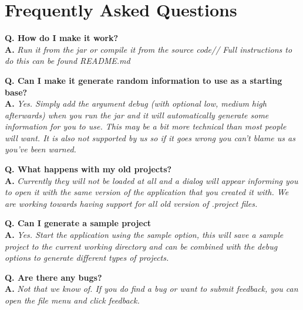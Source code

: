 \section{Frequently Asked Questions}

\newcommand{\faqentry}[2]{\textbf{Q. #1}\\  \textbf{A.} \textit{#2}\vspace{0.5cm}}


\faqentry{How do I make it work?}{Run it from the jar or compile it from the source code//
	Full instructions to  do this can be found README.md}

\faqentry{Can I make it generate random information to use as a starting base?}{Yes. Simply add the argument debug (with optional low, medium high afterwards) when you run the jar and it will automatically generate some information for you to use. This may be a bit more technical than most people will want. It is also not supported by us so if it goes wrong you can't blame us as you've been warned.}

\faqentry{What happens with my old projects?}{Currently they will not be loaded at all and a dialog will appear informing you to open it with the same version of the application that you created it with. We are working towards having support for all old version of .project files.}

\faqentry{Can I generate a sample project}{Yes. Start the application using the sample option, this will save a sample project to the current working directory and can be combined with the debug options to generate different types of projects.}

\faqentry{Are there any bugs?}
{
Not that we know of.\newline
If you do find a bug or want to submit feedback, you can open the file menu and click feedback.
}
